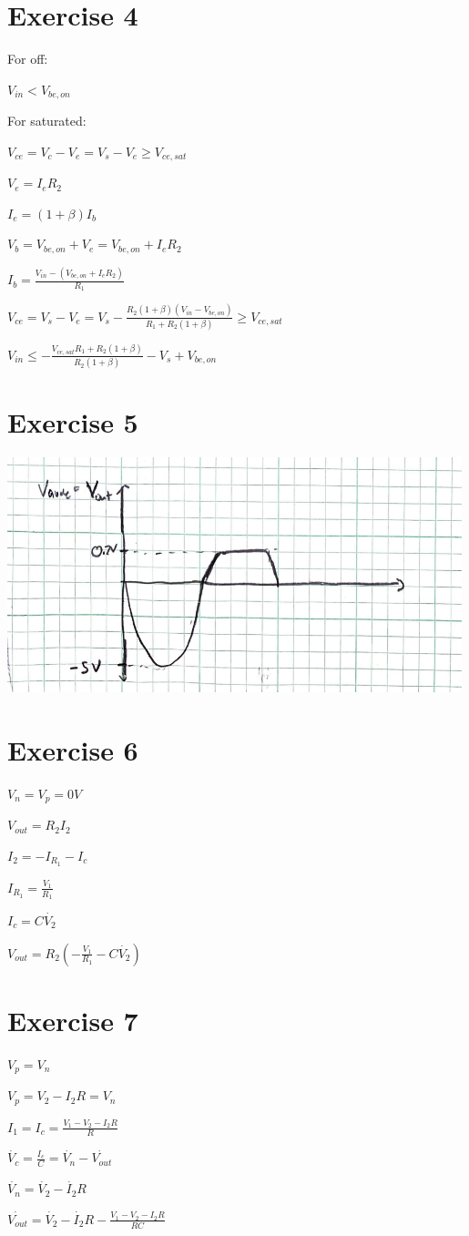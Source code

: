 \documentclass[12pt]{article}
\begin{document}
\section*{Exercise 4}
{\setlength{\parindent}{0cm}
For off:

$V_{in} < V_{be,on}$

For saturated:

$V_{ce} = V_c - V_e = V_s - V_e \ge V_{ce,sat}$

$V_e = I_e R_2$

$I_e = (1+\beta) I_b$

$V_b = V_{be,on} + V_e = V_{be,on} + I_e R_2$

$I_b = \frac{V_{in} - (V_{be,on} + I_e R_2)}{R_1}$

$V_{ce} = V_s - V_e = V_s - \frac{R_2 (1+\beta) (V_{in} - V_{be,on})}{R_1 + R_2(1+\beta)} \ge V_{ce,sat}$

$V_{in} \le - \frac{V_{ce,sat} R_1 + R_2(1+\beta)}{R_2 (1+\beta)} - V_s + V_{be,on}$
}

\section*{Exercise 5}
\includegraphics[width=5.2in]{5.png}

\section*{Exercise 6}
{\setlength{\parindent}{0cm}
$V_n = V_p = 0 V$

$V_{out} = R_2 I_2$

$I_2 = -I_{R_1} -I_c$

$I_{R_1} = \frac{V_1}{R_1}$

$I_c = C \dot{V_2}$

$V_{out} = R_2 (-\frac{V_1}{R_1} - C \dot{V_2})$
}


\section*{Exercise 7}
{\setlength{\parindent}{0cm}
$V_p = V_n$

$V_p = V_2 - I_2 R = V_n$

$I_1 = I_c = \frac{V_1 - V_2 - I_2 R}{R}$

$\dot{V_c} = \frac{I_c}{C} = \dot{V_n} - \dot{V_{out}}$

$\dot{V_n} = \dot{V_2} - \dot{I_2} R$

$\dot{V_{out}} = \dot{V_2} - \dot{I_2} R - \frac{V_1 - V_2 - I_2 R}{RC}$
}
\end{document}
